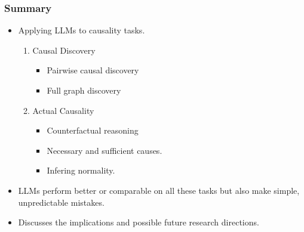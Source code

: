 \documentclass{beamer}
\begin{document}
\begin{frame}
	\frametitle{Summary}
	\begin{itemize}
		\item Applying LLMs to causality tasks.
		\begin{enumerate}
			\item Causal Discovery
				\begin{itemize}
					\item Pairwise causal discovery
					\item Full graph discovery
				\end{itemize}
			\item Actual Causality
				\begin{itemize}
					\item Counterfactual reasoning
					\item Necessary and sufficient causes.
					\item Infering normality.
				\end{itemize}
		\end{enumerate}
		\item LLMs perform better or comparable on all these tasks but also make simple, unpredictable mistakes.
		\item Discusses the implications and possible future research
			directions.
	\end{itemize}
\end{frame}
\end{document}
